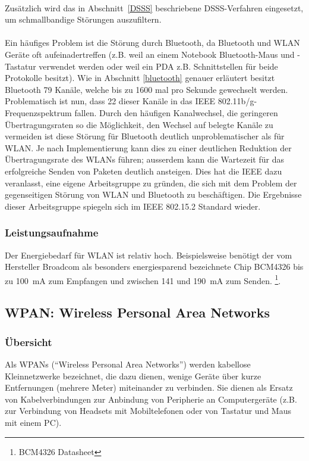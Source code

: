             \\
            Zusätzlich wird das in Abschnitt~\ref{DSSS} beschriebene DSSS-Verfahren
            eingesetzt, um schmallbandige Störungen auszufiltern. \\
            \\
            Ein häufiges Problem ist die Störung durch Bluetooth, da 
            Bluetooth und WLAN Geräte oft aufeinadertreffen (z.B. weil an einem
            Notebook Bluetooth-Maus und -Tastatur verwendet werden oder weil 
            ein PDA z.B. Schnittstellen für beide Protokolle besitzt).
            Wie in Abschnitt \ref{bluetooth} genauer erläutert besitzt Bluetooth
            79 Kanäle, welche bis zu 1600 mal pro Sekunde gewechselt werden.
            Problematisch ist nun, dass 22 dieser Kanäle in das 
            IEEE 802.11b/g-Frequenzspektrum fallen. Durch den häufigen
            Kanalwechsel, die geringeren Übertragungsraten so die 
            Möglichkeit, den Wechsel auf belegte Kanäle zu vermeiden ist diese
            Störung für Bluetooth deutlich unproblematischer als für WLAN. 
            Je nach Implementierung kann dies zu einer deutlichen Reduktion
            der Übertragungsrate des WLANs führen; ausserdem kann die Wartezeit
            für das erfolgreiche Senden von Paketen deutlich ansteigen.
            Dies hat die IEEE dazu veranlasst, eine eigene Arbeitsgruppe
            zu gründen, die sich mit dem Problem der gegenseitigen Störung
            von WLAN und Bluetooth zu beschäftigen. Die Ergebnisse dieser
            Arbeitsgruppe spiegeln sich im IEEE 802.15.2 Standard wieder.

        \subsubsection{Leistungsaufnahme}
            Der Energiebedarf für WLAN ist relativ hoch. Beispielsweise benötigt der
            vom Hersteller Broadcom als besonders energiesparend bezeichnete Chip
            BCM4326 bis zu 100~mA zum Empfangen und zwischen 141 und 190~mA zum Senden.
            \footnote{BCM4326 Datasheet}. 

    \subsection{WPAN: Wireless Personal Area Networks}
        \subsubsection{Übersicht}
            Als WPANs ("`Wireless Personal Area Networks"') werden kabellose Kleinnetzwerke bezeichnet, die dazu dienen,
            wenige Geräte über kurze Entfernungen (mehrere Meter) miteinander zu verbinden. Sie dienen als Ersatz 
            von Kabelverbindungen zur Anbindung von Peripherie an Computergeräte (z.B. zur Verbindung von
            Headsets mit Mobiltelefonen oder von Tastatur und Maus mit einem PC).
            

